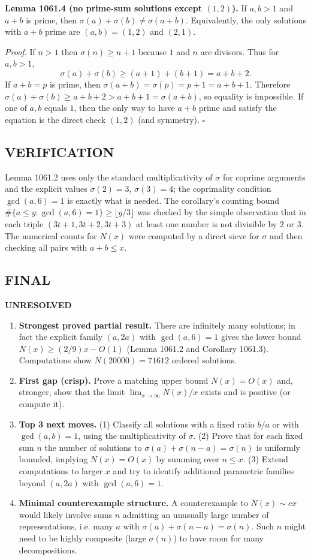 \medskip
\textbf{Lemma 1061.4 (no prime-sum solutions except $(1,2)$).}
If $a,b>1$ and $a+b$ is prime, then $\sigma(a)+\sigma(b)\ne \sigma(a+b)$. Equivalently, the only solutions with $a+b$ prime are $(a,b)=(1,2)$ and $(2,1)$.

\emph{Proof.}
If $n>1$ then $\sigma(n)\ge n+1$ because $1$ and $n$ are divisors. Thus for $a,b>1$,
\[
\sigma(a)+\sigma(b)\ge (a+1)+(b+1)=a+b+2.
\]
If $a+b=p$ is prime, then $\sigma(a+b)=\sigma(p)=p+1=a+b+1$. Therefore $\sigma(a)+\sigma(b)\ge a+b+2> a+b+1=\sigma(a+b)$, so equality is impossible.
If one of $a,b$ equals $1$, then the only way to have $a+b$ prime and satisfy the equation is the direct check $(1,2)$ (and symmetry). \hfill$\square$

\subsection*{VERIFICATION}
Lemma 1061.2 uses only the standard multiplicativity of $\sigma$ for coprime arguments and the explicit values $\sigma(2)=3$, $\sigma(3)=4$; the coprimality condition $\gcd(a,6)=1$ is exactly what is needed.
The corollary's counting bound $\#\{a\le y:\gcd(a,6)=1\}\ge \lfloor y/3\rfloor$ was checked by the simple observation that in each triple $(3t+1,3t+2,3t+3)$ at least one number is not divisible by $2$ or $3$.
The numerical counts for $N(x)$ were computed by a direct sieve for $\sigma$ and then checking all pairs with $a+b\le x$.

\subsection*{FINAL}
\textbf{UNRESOLVED}
\begin{enumerate}
\item[(i)] \textbf{Strongest proved partial result.}
There are infinitely many solutions; in fact the explicit family $(a,2a)$ with $\gcd(a,6)=1$ gives the lower bound $N(x)\ge (2/9)x-O(1)$ (Lemma 1061.2 and Corollary 1061.3). Computations show $N(20000)=71612$ ordered solutions.
\item[(ii)] \textbf{First gap (crisp).}
Prove a matching upper bound $N(x)=O(x)$ and, stronger, show that the limit $\lim_{x\to\infty} N(x)/x$ exists and is positive (or compute it).
\item[(iii)] \textbf{Top 3 next moves.}
(1) Classify all solutions with a fixed ratio $b/a$ or with $\gcd(a,b)=1$, using the multiplicativity of $\sigma$.
(2) Prove that for each fixed sum $n$ the number of solutions to $\sigma(a)+\sigma(n-a)=\sigma(n)$ is uniformly bounded, implying $N(x)=O(x)$ by summing over $n\le x$.
(3) Extend computations to larger $x$ and try to identify additional parametric families beyond $(a,2a)$ with $\gcd(a,6)=1$.
\item[(iv)] \textbf{Minimal counterexample structure.}
A counterexample to $N(x)\sim cx$ would likely involve sums $n$ admitting an unusually large number of representations, i.e. many $a$ with $\sigma(a)+\sigma(n-a)=\sigma(n)$. Such $n$ might need to be highly composite (large $\sigma(n)$) to have room for many decompositions.
\end{enumerate}




